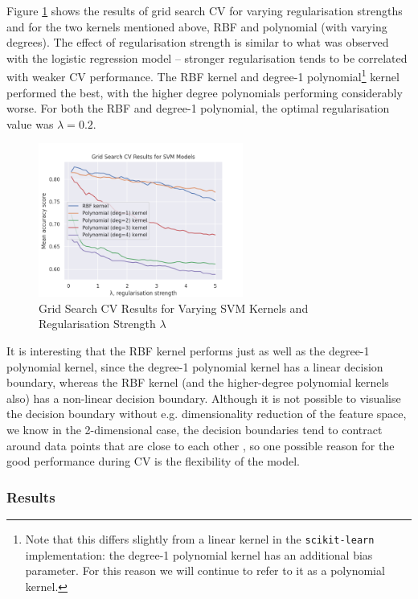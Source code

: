 Figure \ref{svmgridsearchcv} shows the results of grid search CV for varying regularisation strengths and for the two kernels mentioned above, RBF and polynomial (with varying degrees). The effect of regularisation strength is similar to what was observed with the logistic regression model -- stronger regularisation tends to be correlated with weaker CV performance. The RBF kernel and degree-1 polynomial\footnote{Note that this differs slightly from a linear kernel in the \texttt{scikit-learn} implementation: the degree-1 polynomial kernel has an additional bias parameter. For this reason we will continue to refer to it as a polynomial kernel.} kernel performed the best, with the higher degree polynomials performing considerably worse. For both the RBF and degree-1 polynomial, the optimal regularisation value was $\lambda = 0.2$.

\begin{figure}[!ht]
\begin{center}
\includegraphics[width=0.6\textwidth]{fig/grid_search_cv_svm.png}
\end{center}
\caption{Grid Search CV Results for Varying SVM Kernels and Regularisation Strength $\lambda$}
\label{svmgridsearchcv}
\end{figure}

It is interesting that the RBF kernel performs just as well as the degree-1 polynomial kernel, since the degree-1 polynomial kernel has a linear decision boundary, whereas the RBF kernel (and the higher-degree polynomial kernels also) has a non-linear decision boundary. Although it is not possible to visualise the decision boundary without e.g. dimensionality reduction of the feature space, we know in the 2-dimensional case, the decision boundaries tend to contract around data points that are close to each other \parencite{svmvis}, so one possible reason for the good performance during CV is the flexibility of the model.

\subsubsection{Results}

